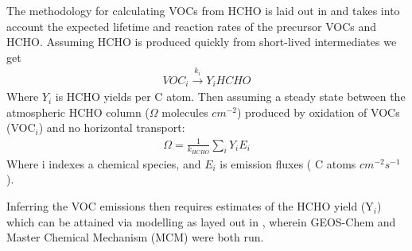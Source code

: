 The methodology for calculating VOCs from HCHO is laid out in \citet{Palmer_2003} and takes into account the expected lifetime and reaction rates of the precursor VOCs and HCHO.
Assuming HCHO is produced quickly from short-lived intermediates we get
\begin{eqnarray*}
VOC_i \overset{k_i}{\rightarrow} Y_i HCHO
\end{eqnarray*}
Where $Y_i$ is HCHO yields per C atom.
Then assuming a steady state between the atmospheric HCHO column ($\Omega$ molecules $cm^{-2}$)  produced by oxidation of VOCs (VOC$_i$) and no horizontal transport:
\begin{eqnarray*}
\Omega = \frac{1}{k_{HCHO}} \sum_{i} Y_i E_i
\end{eqnarray*}
Where i indexes a chemical species, and $E_i$ is emission fluxes ( C atoms $cm^{-2}s^{-1}$).

Inferring the VOC emissions then requires estimates of the HCHO yield (Y$_i$) which can be attained via modelling as layed out in \citet{Millet_2006}, wherein GEOS-Chem and Master Chemical Mechanism (MCM) were both run.

